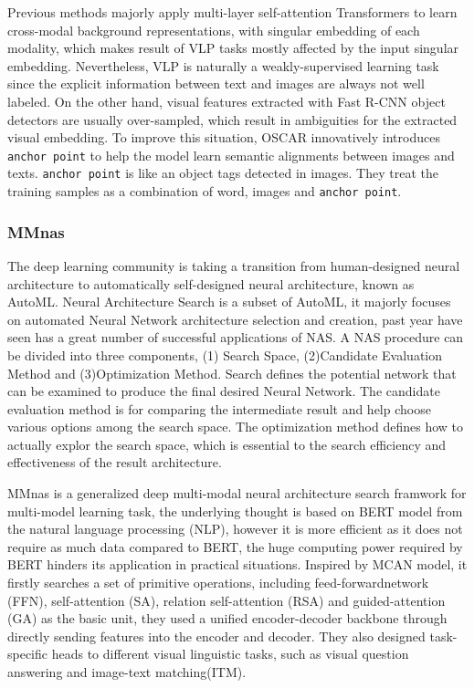 \documentclass[12pt, a4paper]{article}
\begin{document}
\par\noindent \newline Previous methods majorly apply multi-layer self-attention Transformers to learn cross-modal background representations, with singular embedding of each modality, which makes result of VLP tasks mostly affected by the input singular embedding. Nevertheless, VLP is naturally a weakly-supervised learning task since the explicit information between text and images are always not well labeled. On the other hand, visual features extracted with Fast R-CNN object detectors  are usually over-sampled, which result in ambiguities for the extracted visual embedding. To improve this situation, OSCAR \cite{DBLP:journals/corr/abs-2004-06165} innovatively introduces \verb|anchor point| to help the model learn semantic alignments between images and texts. \verb|anchor point| is like an object tags detected in images. They treat the training samples as a combination of word, images and \verb|anchor point|.

\subsubsection*{MMnas}
\par\noindent The deep learning community is taking a transition from human-designed neural architecture to automatically self-designed neural architecture, known as AutoML. Neural Architecture Search is a subset of AutoML, it majorly focuses on automated Neural Network architecture selection and creation, past year have seen has a great number of successful applications of NAS. A NAS procedure can be divided into three components, (1) Search Space, (2)Candidate Evaluation Method and (3)Optimization Method. Search defines the potential network that can be examined to produce the final desired Neural Network. The candidate evaluation method is for comparing the intermediate result and help choose various options among the search space. The optimization method defines how to actually explor the search space, which is essential to the search efficiency and effectiveness of the result architecture.

\par\noindent \newline MMnas \cite{DBLP:journals/corr/abs-2004-12070} is a generalized deep multi-modal neural architecture search framwork for multi-model learning task, the underlying thought is based on BERT model from the natural language processing (NLP), however it is more efficient as it does not require as much data compared to BERT, the huge computing power required by BERT hinders its application in practical situations. Inspired by MCAN model, it firstly searches a set of primitive operations, including feed-forwardnetwork (FFN), self-attention (SA), relation self-attention (RSA) and guided-attention (GA) as the basic unit, they used a unified encoder-decoder backbone through directly sending features into the encoder and decoder. They also designed task-specific heads to different visual linguistic tasks, such as visual question answering and image-text matching(ITM).
\end{document}

